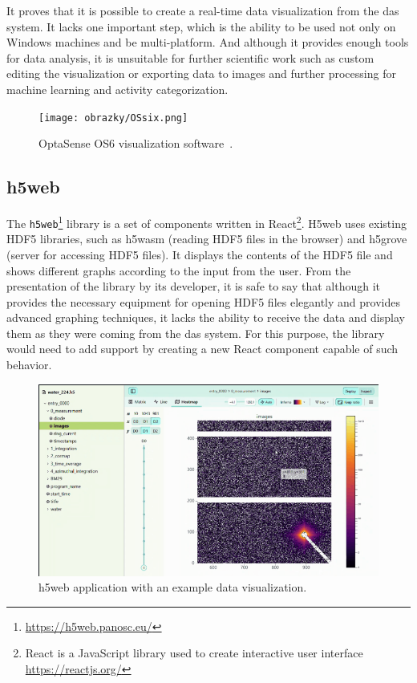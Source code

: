 It proves that it is possible to create a real-time data visualization from the \ac{das} system. It lacks one important step, which is the ability to be used not only on Windows machines and be multi-platform. And although it provides enough tools for data analysis, it is unsuitable for further scientific work such as custom editing the visualization or exporting data to images and further processing for machine learning and activity categorization.

\begin{figure}[t]
    \centering
    \texttt{[image: obrazky/OSsix.png]}
    \caption{OptaSense OS6 visualization software~\cite{ytossix}.}
    \label{fig:ossix}
\end{figure}


\subsection{h5web}\label{txt.design.h5web}

The \verb|h5web|\footnote{\url{https://h5web.panosc.eu/}} library is a set of components written in React\footnote{React is a JavaScript library used to create interactive user interface \url{https://reactjs.org/}}. H5web uses existing HDF5 libraries, such as h5wasm (reading HDF5 files in the browser) and h5grove (server for accessing HDF5 files). It displays the contents of the HDF5 file and shows different graphs according to the input from the user. From the presentation of the library by its developer, it is safe to say that although it provides the necessary equipment for opening HDF5 files elegantly and provides advanced graphing techniques, it lacks the ability to receive the data and display them as they were coming from the \ac{das} system. For this purpose, the library would need to add support by creating a new React component capable of such behavior.

\begin{figure}
    \centering
    \includegraphics[width=\linewidth]{obrazky/h5web.png}
    \caption{h5web application with an example data visualization.}
    \label{fig:h5web}
\end{figure}

\newpage
